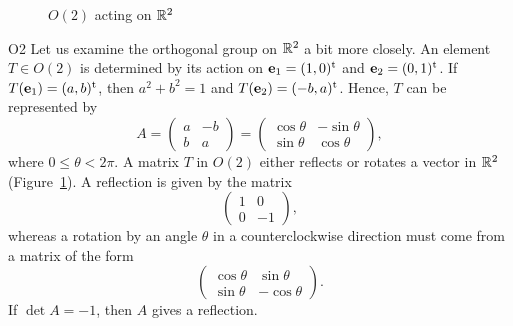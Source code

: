  
 
\begin{figure}[htb]

\begin{center}
\end{center}

\caption{$O(2)$ acting on ${\Bbb R}^2$}
\label{O2}
\end{figure}
 
\begin{example}{O2}
Let us examine the orthogonal group  on ${\Bbb R}^2$ a bit more
closely.  An element $T \in O(2)$ is determined by its action on
${\mathbf e}_1 = (1, 0)^{\rm t}$ and ${\mathbf e}_2 = (0, 1)^{\rm t}$. If
$T({\mathbf e}_1) = (a,b)^{\rm t}$, then $a^2 + b^2 = 1$ and $T({\mathbf
e}_2) = (-b, a)^{\rm t}$. Hence, $T$ can be represented by 
\[
A
=
\begin{pmatrix}
a & -b \\
b & a
\end{pmatrix}
=
\begin{pmatrix}
\cos \theta & - \sin \theta \\
\sin \theta & \cos \theta
\end{pmatrix},
\]
where $0 \leq \theta < 2 \pi$. A matrix $T$ in $O(2)$ either reflects
or rotates a vector in ${\Bbb R}^2$ (Figure~\ref{O2}). A reflection is
given by the matrix 
\[
\begin{pmatrix}
1 & 0 \\
0 & -1
\end{pmatrix},
\]
whereas a rotation by an angle $\theta$ in a counterclockwise direction
must come from a matrix of the form 
\[
\begin{pmatrix}
\cos \theta & \sin \theta \\
\sin \theta & -\cos \theta
\end{pmatrix}.
\]
If $\det A =-1$, then $A$ gives a reflection.
\end{example}
 
